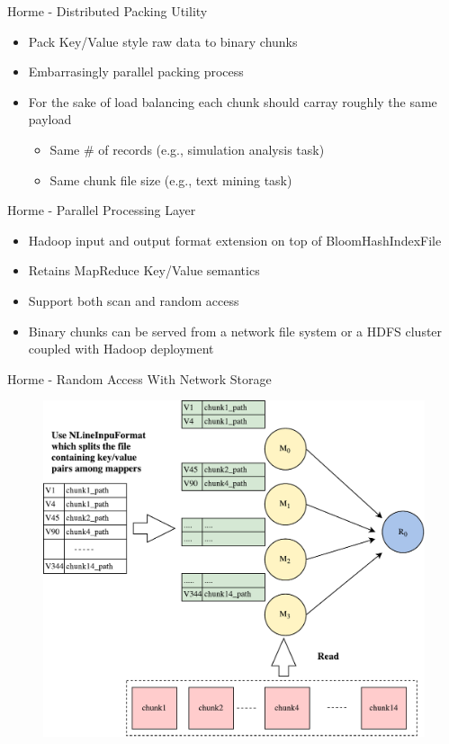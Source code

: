 \documentclass[newPxFont]{beamer}
\begin{document}
\begin{frame}[c]{Horme - Distributed Packing Utility}
  \begin{itemize}
    \item Pack Key/Value style raw data to binary chunks
    \item Embarrasingly parallel packing process
    \item For the sake of load balancing each chunk should carray roughly the same payload
    \begin{itemize}
      \item Same # of records (e.g., simulation analysis task)
      \item Same chunk file size (e.g., text mining task)
    \end{itemize}
  \end{itemize}
\end{frame}

\begin{frame}[c]{Horme - Parallel Processing Layer}
  \begin{itemize}
    \item Hadoop input and output format extension on top of BloomHashIndexFile
    \item Retains MapReduce Key/Value semantics 
    \item Support both scan and random access 
    \item Binary chunks can be served from a network file system or a HDFS cluster coupled with Hadoop deployment
  \end{itemize}
\end{frame}

\begin{frame}[c]{Horme - Random Access With Network Storage}
\begin{figure}[t]
  \includegraphics[scale=0.4]{horme-with-pfs}
  \centering
\end{figure}
\end{frame}
\end{document}
